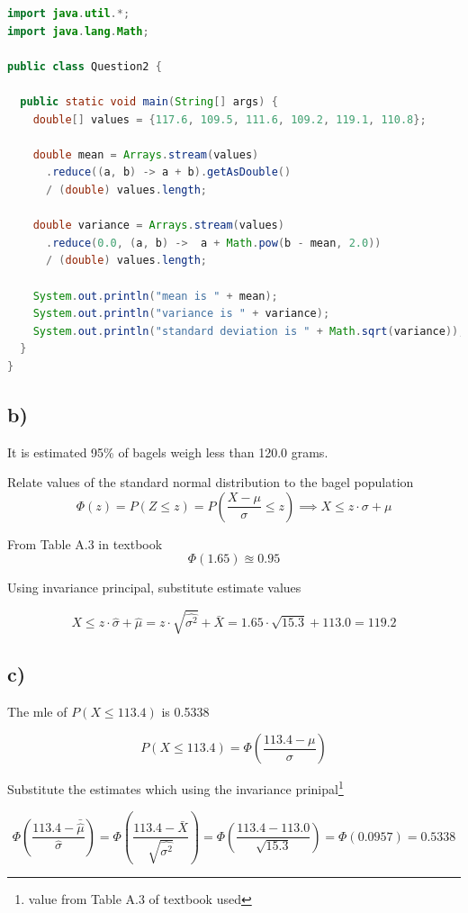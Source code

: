 \documentclass[a4paper,11pt]{article}
\begin{document}
\begin{lstlisting}[language=Java]
import java.util.*;
import java.lang.Math;

public class Question2 {

  public static void main(String[] args) {
    double[] values = {117.6, 109.5, 111.6, 109.2, 119.1, 110.8};
    
    double mean = Arrays.stream(values)
      .reduce((a, b) -> a + b).getAsDouble()
      / (double) values.length;
    
    double variance = Arrays.stream(values)
      .reduce(0.0, (a, b) ->  a + Math.pow(b - mean, 2.0)) 
      / (double) values.length;

    System.out.println("mean is " + mean);
    System.out.println("variance is " + variance);
    System.out.println("standard deviation is " + Math.sqrt(variance));
  }
}
\end{lstlisting}

\clearpage
\subsection*{b)}

It is estimated 95\% of bagels weigh less than 120.0 grams.\newline


Relate values of the standard normal distribution to the bagel population
\[ \Phi(z) = P(Z \le z) = P\left(\frac{X - \mu}{\sigma}\le z\right) \implies X \le z \cdot \sigma + \mu \]


From Table A.3 in textbook
\[ \Phi(1.65) \approxeq 0.95\]


Using invariance principal, substitute estimate values

\[ X \le z \cdot \hat{\sigma}+ \hat{\mu} = z \cdot \sqrt{\hat{\sigma^2}} + \bar{X} = 1.65 \cdot \sqrt{15.3} + 113.0 = 119.2 \]

\subsection*{c)}

The mle of $P(X \le 113.4)$ is 0.5338

\[P(X \le 113.4) = \Phi\left(\frac{113.4 - \mu}{\sigma}\right) \]

\vspace{1cm}
Substitute the estimates which using the invariance prinipal\footnote{value from Table A.3 of textbook used}

\[ \Phi\left(\frac{113.4 - \bar{\hat{\mu}}}{\hat{\sigma}}\right) = \Phi\left(\frac{113.4 - \bar{X}}{\sqrt{\hat{\sigma^2}}}\right) = \Phi\left(\frac{113.4 - 113.0}{\sqrt{15.3}}\right) = \Phi(0.0957) = 0.5338 \]
\end{document}
